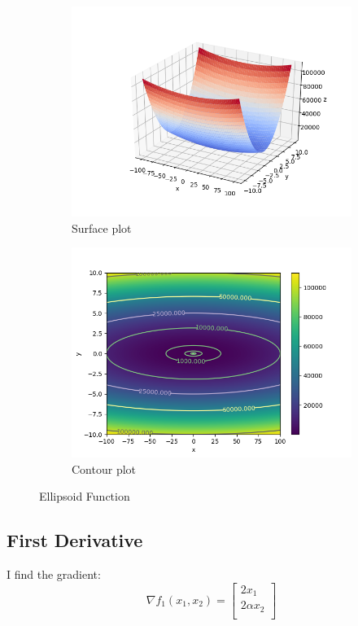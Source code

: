 \documentclass[a4paper]{article}
\begin{document}
\begin{figure}[H]
  \centering
  \begin{subfigure}[b]{0.49\textwidth}
    \centering
    \includegraphics[width=\textwidth]{imgs/plt11}
    \caption{Surface plot}
  \end{subfigure}
  \begin{subfigure}[b]{0.49\textwidth}
    \centering
    \includegraphics[width=\textwidth]{imgs/plt12}
    \caption{Contour plot}
  \end{subfigure}
  \caption{Ellipsoid Function}
  \label{plt1}
\end{figure}

\subsection{First Derivative}
I find the gradient:
\[
\nabla f_1(x_1,x_2) = 
\begin{bmatrix}
    2 x_1\\
    2\alpha x_2\\
\end{bmatrix}
\]
\end{document}
